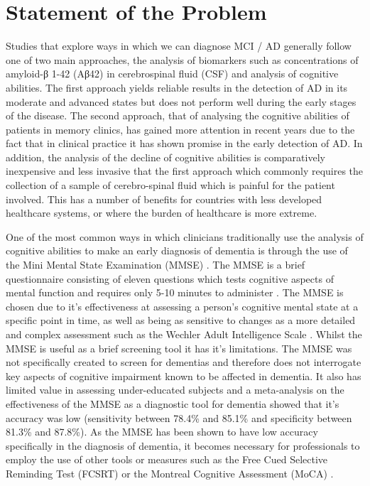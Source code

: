 \documentclass[10pt, letterpaper, twoside, openany]{thesis}
\begin{document}
\section{Statement of the Problem}
Studies that explore ways in which we can diagnose MCI / AD generally follow one of two main approaches, the analysis of biomarkers such as concentrations of amyloid-β 1-42 (Aβ42) in cerebrospinal fluid (CSF) and analysis of cognitive abilities. The first approach yields reliable results in the detection of AD in its moderate and advanced states but does not perform well during the early stages of the disease. The second approach, that of analysing the cognitive abilities of patients in memory clinics, has gained more attention in recent years due to the fact that in clinical practice it has shown promise in the early detection of AD. In addition, the analysis of the decline of cognitive abilities is comparatively inexpensive and less invasive that the first approach which commonly requires the collection of a sample of cerebro-spinal fluid which is painful for the patient involved. This has a number of benefits for countries with less developed healthcare systems, or where the burden of healthcare is more extreme. 
\par
One of the most common ways in which clinicians traditionally use the analysis of cognitive abilities to make an early diagnosis of dementia is through the use of the Mini Mental State Examination (MMSE) \cite{Folstein1975}. The MMSE is a brief questionnaire consisting of eleven questions which tests cognitive aspects of mental function and requires only 5-10 minutes to administer \cite{Folstein1975}. The MMSE is chosen due to it's effectiveness at assessing a person's cognitive mental state at a specific point in time, as well as being as sensitive to changes as a more detailed and complex assessment such as the Wechler Adult Intelligence Scale \cite{Folstein1975}. Whilst the MMSE is useful as a brief screening tool it has it's limitations. The MMSE was not specifically created to screen for dementias and therefore does not interrogate key aspects of cognitive impairment known to be affected in dementia. It also has limited value in assessing under-educated subjects and a meta-analysis on the effectiveness of the MMSE as a diagnostic tool for dementia showed that it's accuracy was low (sensitivity between 78.4\% and 85.1\% and specificity between 81.3\% and 87.8\%). As the MMSE has been shown to have low accuracy specifically in the diagnosis of dementia, it becomes necessary for professionals to employ the use of other tools or measures such as the Free Cued Selective Reminding Test (FCSRT) \cite{Grober2010} or the Montreal Cognitive Assessment (MoCA) \cite{Davis2015}.
\end{document}
